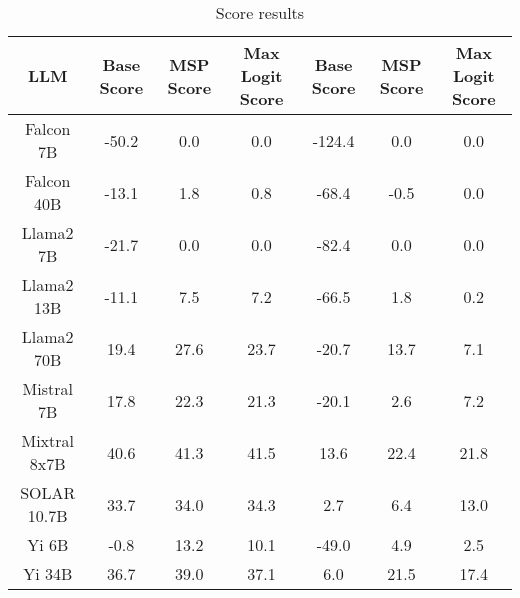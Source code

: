 \renewcommand\arraystretch{1.2}
\begin{table*}
\centering
\begin{tabular}{c|c|c|c|c|c|c}
LLM & Base Score & MSP Score & Max Logit Score & Base Score & MSP Score & Max Logit Score\\ \hline
Falcon 7B & -50.2 & 0.0 & 0.0 & -124.4 & 0.0 & 0.0\\
Falcon 40B & -13.1 & 1.8 & 0.8 & -68.4 & -0.5 & 0.0\\
Llama2 7B & -21.7 & 0.0 & 0.0 & -82.4 & 0.0 & 0.0\\
Llama2 13B & -11.1 & 7.5 & 7.2 & -66.5 & 1.8 & 0.2\\
Llama2 70B & 19.4 & 27.6 & 23.7 & -20.7 & 13.7 & 7.1\\
Mistral 7B & 17.8 & 22.3 & 21.3 & -20.1 & 2.6 & 7.2\\
Mixtral 8x7B & 40.6 & 41.3 & 41.5 & 13.6 & 22.4 & 21.8\\
SOLAR 10.7B & 33.7 & 34.0 & 34.3 & 2.7 & 6.4 & 13.0\\
Yi 6B & -0.8 & 13.2 & 10.1 & -49.0 & 4.9 & 2.5\\
Yi 34B & 36.7 & 39.0 & 37.1 & 6.0 & 21.5 & 17.4\\
\hline
\end{tabular}
\caption{Score results}
\end{table*}
\label{tab:score}
